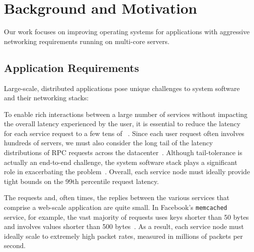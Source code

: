 
\section{Background and Motivation}
\label{sec:motivation}

Our work focuses on improving operating systems for applications with
aggressive networking requirements running on multi-core servers.

\subsection{Application Requirements}
\label{sec:motivation:challenges}


Large-scale, distributed applications pose unique challenges to system
software and their networking stacks:

 To enable rich interactions
between a large number of services without impacting the overall
latency experienced by the user, it is essential to reduce the latency
for each service request to a few tens of
\microsecond~\cite{luiz-isscc,DBLP:conf/hotos/RumbleOSRO11}.  Since
each user request often involves hundreds of servers, we must also
consider the long tail of the latency distributions of RPC requests
across the datacenter~\cite{DBLP:journals/cacm/DeanB13}. Although
tail-tolerance is actually an end-to-end challenge, the system
software stack plays a significant role in exacerbating the
problem~\cite{DBLP:conf/eurosys/LeverichK14}. Overall, each service
node must ideally provide tight bounds on the 99th percentile request
latency.

 The requests and, often times, the
replies between the various services that comprise a web-scale
application are quite small. In Facebook's \texttt{memcached} service,
for example, the vast majority of requests uses keys shorter than 50
bytes and involves values shorter than 500
bytes~\cite{Atikoglu:2012:WAL}. As a result, each service node must
ideally scale to extremely high packet rates, measured in millions of
packets per second. 

